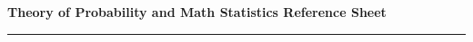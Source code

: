 \documentclass[10pt,landscape,a4paper]{article}
\newcommand{\header}{\begin{center}
		\textbf{Theory of Probability and Math Statistics Reference Sheet}
	\end{center}}
\begin{document}
	\let\displaystyle\textstyle
	\small
	\begin{multicols*}{5}
		\header
		\hrule
		
		
		
		
		
		
		
		
		
	\end{multicols*}
	
\end{document}
